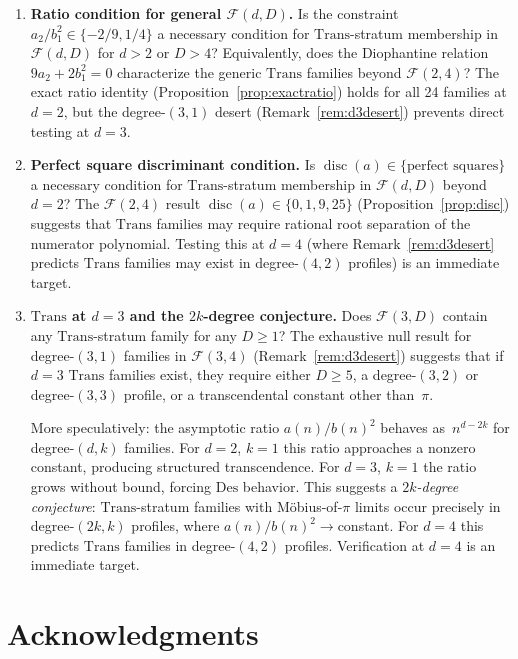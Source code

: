 \documentclass[12pt, reqno]{amsart}
\theoremstyle{definition}
\theoremstyle{remark}
\newcommand{\Trans}{\mathrm{Trans}}
\newcommand{\Des}{\mathrm{Des}}
\DeclareMathOperator{\disc}{disc}
\begin{document}
\begin{enumerate}[\bfseries(P1)]
\item \textbf{Ratio condition for general $\mathcal{F}(d,D)$.}
Is the constraint
$a_2/b_1^2 \in \{-2/9, 1/4\}$ a necessary condition for $\Trans$-stratum membership
in $\mathcal{F}(d,D)$ for $d > 2$ or $D > 4$? Equivalently, does the Diophantine relation
$9a_2 + 2b_1^2 = 0$ characterize the generic $\Trans$ families beyond $\mathcal{F}(2,4)$?
The exact ratio identity (Proposition~\ref{prop:exactratio}) holds for all 24 families at $d=2$,
but the degree-$(3,1)$ desert (Remark~\ref{rem:d3desert}) prevents direct testing at $d=3$.

\item \textbf{Perfect square discriminant condition.}
Is $\disc(a) \in \{\text{perfect squares}\}$
a necessary condition for $\Trans$-stratum membership in $\mathcal{F}(d,D)$ beyond $d=2$?
The $\mathcal{F}(2,4)$ result $\disc(a) \in \{0, 1, 9, 25\}$ (Proposition~\ref{prop:disc}) suggests that
$\Trans$ families may require rational root separation of the numerator polynomial.
Testing this at $d=4$ (where Remark~\ref{rem:d3desert} predicts $\Trans$ families may exist in
degree-$(4,2)$ profiles) is an immediate target.

\item \textbf{$\Trans$ at $d=3$ and the $2k$-degree conjecture.}
Does $\mathcal{F}(3,D)$ contain any $\Trans$-stratum family for any
$D \ge 1$? The exhaustive null result for degree-$(3,1)$
families in $\mathcal{F}(3,4)$ (Remark~\ref{rem:d3desert}) suggests that if $d=3$
$\Trans$ families exist, they require either $D \ge 5$,
a degree-$(3,2)$ or degree-$(3,3)$ profile, or a
transcendental constant other than~$\pi$.

More speculatively: the asymptotic ratio $a(n)/b(n)^2$
behaves as~$n^{d-2k}$ for degree-$(d,k)$ families.
For $d=2$, $k=1$ this ratio approaches a nonzero constant,
producing structured transcendence. For $d=3$, $k=1$
the ratio grows without bound, forcing $\Des$ behavior.
This suggests a \emph{$2k$-degree conjecture}: $\Trans$-stratum
families with M\"obius-of-$\pi$ limits occur precisely in
degree-$(2k,k)$ profiles, where $a(n)/b(n)^2 \to {}$constant.
For $d=4$ this predicts $\Trans$ families in degree-$(4,2)$
profiles. Verification at $d=4$ is an immediate target.
\end{enumerate}


\section*{Acknowledgments}
\end{document}

